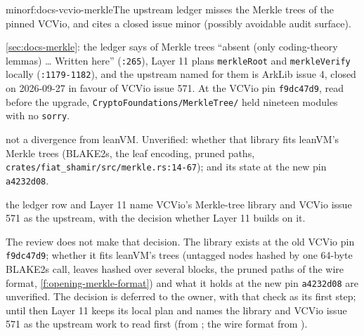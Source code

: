 \begin{finding}{minor}{f:docs-vcvio-merkle}{The upstream ledger misses the Merkle trees of the pinned VCVio, and cites a closed issue}
 minor (possibly avoidable audit surface).
 \begin{sloppypar}
\cref{sec:docs-merkle}: the ledger says of Merkle trees ``absent (only coding-theory lemmas) … Written here'' (\texttt{:\allowbreak{}265}), Layer 11 plans \texttt{merkleRoot} and \texttt{merkleVerify} locally (\texttt{:\allowbreak{}1179-\allowbreak{}1182}), and the upstream named for them is ArkLib issue 4, closed on 2026-09-27 in favour of VCVio issue 571. At the VCVio pin \texttt{f9dc47d9}, read before the upgrade, \texttt{Crypto\allowbreak{}Foundations/\allowbreak{}Merkle\allowbreak{}Tree/\allowbreak{}} held nineteen modules with no \texttt{sorry}.
\end{sloppypar}
 \begin{sloppypar}
not a divergence from leanVM. Unverified: whether that library fits leanVM's Merkle trees (BLAKE2s, the leaf encoding, pruned paths, \texttt{crates/\allowbreak{}fiat\_\allowbreak{}shamir/\allowbreak{}src/\allowbreak{}merkle.\allowbreak{}rs:\allowbreak{}14-\allowbreak{}67}); and its state at the new pin \texttt{a4232d08}.
\end{sloppypar}
 the ledger row and Layer 11 name VCVio's Merkle-tree library and VCVio issue 571 as the upstream, with the decision whether Layer 11 builds on it.

\begin{sloppypar}
The review does not make that decision. The library exists at the old VCVio pin \texttt{f9dc47d9}; whether it fits leanVM's trees (untagged nodes hashed by one 64-byte BLAKE2s call, leaves hashed over several blocks, the pruned paths of the wire format, \cref{f:opening-merkle-format}) and what it holds at the new pin \texttt{a4232d08} are unverified. The decision is deferred to the owner, with that check as its first step; until then Layer 11 keeps its local plan and names the library and VCVio issue 571 as the upstream work to read first (from ; the wire format from ).
\end{sloppypar}
\end{finding}

